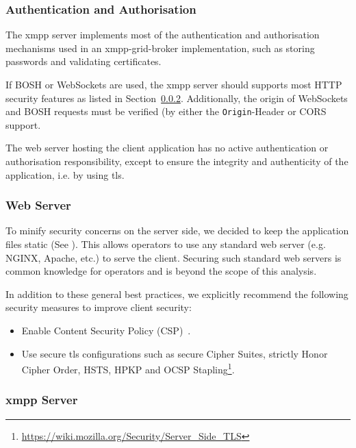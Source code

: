 \subsubsection{Authentication and Authorisation}

The \gls{xmpp} server implements most of the authentication and authorisation mechanisms used in an \gls{xmpp-grid-broker} implementation, such as storing passwords and validating certificates.

If BOSH or WebSockets are used, the \gls{xmpp} server should supports most HTTP security features as listed in Section~\ref{sec:web-server}. Additionally, the origin of WebSockets and BOSH requests must be verified (by either the \texttt{Origin}-Header or CORS support.~\cite{rfc6455}\cite{cross-origin-resource-sharing}

The web server hosting the client application has no active authentication or authorisation responsibility, except to ensure the integrity and authenticity of the application, i.e. by using \gls{tls}.

\subsubsection{Web Server}\label{sec:web-server}

To minify security concerns on the server side, we decided to keep the application files static (See ).
This allows operators to use any standard web server (e.g. NGINX, Apache, etc.) to serve the client.
Securing such standard web servers is common knowledge for operators and is beyond the scope of this analysis.

In addition to these general best practices, we explicitly recommend the following security measures to improve client security:

\begin{itemize}
    \item Enable Content Security Policy (CSP)~\cite{w3c-csp}.
    \item Use secure \gls{tls} configurations such as secure Cipher Suites, strictly Honor Cipher Order, HSTS, HPKP and OCSP Stapling\footnote{\url{https://wiki.mozilla.org/Security/Server_Side_TLS}}.
\end{itemize}


\subsubsection{\gls{xmpp} Server}

